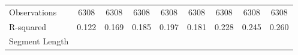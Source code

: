 {\begin{tabular}{l*{8}{c}}
\midrule
Observations        &        6308         &        6308         &        6308         &        6308         &        6308         &        6308         &        6308         &        6308         \\
R-squared           &       0.122         &       0.169         &       0.185         &       0.197         &       0.181         &       0.228         &       0.245         &       0.260         \\
Segment Length      &                     &                     &                     &                     &                     &                     &                     &                     \\
\bottomrule
\end{tabular}
}
